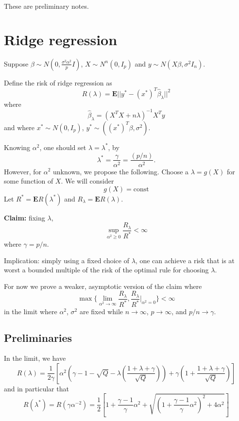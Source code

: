 \documentclass[12pt]{article}
\begin{document}
\maketitle

\newcommand{\tr}{\text{tr}}
\newcommand{\E}{\textbf{E}}
\newcommand{\diag}{\text{diag}}
\newcommand{\argmax}{\text{argmax}}
\newcommand{\Cov}{\text{Cov}}
\newcommand{\Var}{\text{Var}}
\newcommand{\argmin}{\text{argmin}}
\newcommand{\Vol}{\text{Vol}}
\newcommand{\comm}[1]{}

These are preliminary notes.

\section{Ridge regression}

Suppose $\beta \sim N(0, \frac{\sigma^2\alpha^2}{p} I)$, $X \sim N^n(0, I_p)$ and $y \sim N(X\beta, \sigma^2 I_n)$.

Define the risk of ridge regression as
\[
R(\lambda) = \E ||y^* - (x^*)^T \hat{\beta}_\lambda||^2
\]
where
\[
\hat{\beta}_\lambda = (X^T X + n\lambda)^{-1} X^T y
\]
and where $x^* \sim N(0, I_p)$, $y^* \sim ((x^*)^T\beta, \sigma^2)$.

Knowing $\alpha^2$, one should set $\lambda = \lambda^*$, by
\[
\lambda^* = \frac{\gamma}{\alpha^2} = \frac{(p/n)}{\alpha^2}.
\]
However, for $\alpha^2$ unknown, we propose the following.
Choose a $\lambda = g(X)$ for some function of $X$.  We will consider
\[
g(X) = \text{const}
\]
Let $R^* = \E R(\lambda^*)$ and $R_\lambda = \E R(\lambda)$.

\textbf{Claim:} fixing $\lambda$, 
\[
\sup_{\alpha^2 \geq 0} \frac{R_\lambda}{R^*} < \infty
\]
where $\gamma = p/n$.

Implication: simply using a fixed choice of $\lambda$, one can achieve a risk that is at worst a bounded multiple of the risk of the optimal rule for choosing $\lambda$.

For now we prove a weaker, asymptotic version of the claim where
\[
\max\{\lim_{\alpha^2 \to \infty} \frac{R_\lambda}{R^*}, \frac{R_\lambda}{R^*}\bigg|_{\alpha^2 = 0} \} < \infty
\]
in the limit where $\alpha^2$, $\sigma^2$ are fixed while $n \to \infty$, $p\to\infty$, and $p/n \to \gamma$.

\subsection{Preliminaries}

In the limit, we have
\[
R(\lambda) = \frac{1}{2\gamma}\left[\alpha^2(\gamma - 1-\sqrt{Q} -\lambda\left(\frac{1 + \lambda + \gamma}{\sqrt{Q}}\right)) + \gamma\left(1 + \frac{1+\lambda+\gamma}{\sqrt{Q}}\right)\right]
\]
and in particular that
\[
R(\lambda^*) = R(\gamma\alpha^{-2}) = \frac{1}{2}\left[1 + \frac{\gamma-1}{\gamma}\alpha^2 + \sqrt{(1 + \frac{\gamma-1}{\gamma}\alpha^2)^2 + 4\alpha^2}\right]
\]
\end{document}
